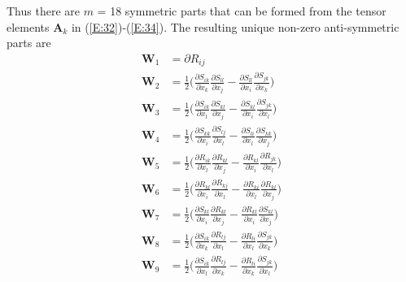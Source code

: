 Thus there are $m$ = 18 symmetric parts that can be formed from the tensor elements $\mathbf{A}_k$ in (\ref{E:32})-(\ref{E:34}). The resulting unique non-zero anti-symmetric parts are 	
%
\begin{subequations}
\label{E:37}
\begin{align}
	\mathbf{W}_1  &= \partial R_{ij}  \\
	\mathbf{W}_2  &= \frac{1}{2} 
			  \bigg( \frac{\partial S_{ik}}{\partial x_k}
					 \frac{\partial S_{ll}}{\partial x_j} 
				  	- 
					 \frac{\partial S_{ll}}{\partial x_i} 
					 \frac{\partial S_{jk}}{\partial x_k} \bigg) \\	
	\mathbf{W}_3  &= \frac{1}{2} 
			  \bigg( \frac{\partial S_{ik}}{\partial x_l}
					 \frac{\partial S_{kl}}{\partial x_j} 
				    - 
					 \frac{\partial S_{kl}}{\partial x_i} 
					 \frac{\partial S_{jk}}{\partial x_l} \bigg) \\				 
	\mathbf{W}_4  &= \frac{1}{2} 
			  \bigg( \frac{\partial S_{kk}}{\partial x_i}
					 \frac{\partial S_{lj}}{\partial x_l} 
				  	- 
					 \frac{\partial S_{li}}{\partial x_l} 
					 \frac{\partial S_{kk}}{\partial x_j} \bigg) \\
	\mathbf{W}_5  &= \frac{1}{2} 
			  \bigg( \frac{\partial R_{ik}}{\partial x_l}
					 \frac{\partial R_{kl}}{\partial x_j} 
				  	- 
					 \frac{\partial R_{kl}}{\partial x_i} 
					 \frac{\partial R_{jk}}{\partial x_l} \bigg)  \\	
	\mathbf{W}_6  &= \frac{1}{2} 
			  \bigg( \frac{\partial R_{kl}}{\partial x_i}
					 \frac{\partial R_{kj}}{\partial x_l} 
				  	- 
					 \frac{\partial R_{ki}}{\partial x_l}
					 \frac{\partial R_{kl}}{\partial x_j}  \bigg)  \\
	\mathbf{W}_7  &= \frac{1}{2} 
			  \bigg( \frac{\partial S_{kl}}{\partial x_i}
					 \frac{\partial R_{kl}}{\partial x_j} 
				  	- 
					 \frac{\partial R_{kl}}{\partial x_i} 
					 \frac{\partial S_{kl}}{\partial x_j} \bigg)  \\
	\mathbf{W}_8  &= \frac{1}{2} 
			  \bigg( \frac{\partial S_{ik}}{\partial x_k}
					 \frac{\partial R_{lj}}{\partial x_l} 
				  	- 
					 \frac{\partial R_{li}}{\partial x_l} 
					 \frac{\partial S_{jk}}{\partial x_k} \bigg)  \\
	\mathbf{W}_9  &= \frac{1}{2} 
			  \bigg( \frac{\partial S_{ik}}{\partial x_l}
					 \frac{\partial R_{lj}}{\partial x_k} 
				  	- 
					 \frac{\partial R_{li}}{\partial x_k} 
					 \frac{\partial S_{jk}}{\partial x_l} \bigg)  \\

\end{align}
\end{subequations}
